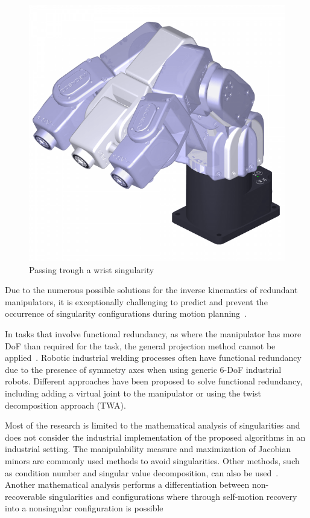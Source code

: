 \begin{figure}[H]
	\centerline{\includegraphics[scale=.25]{figures/wristsingular.png}}
	\caption{Passing trough a wrist singularity~\cite{meca}}
	\label{wristsingular}
\end{figure}
\newpage
Due to the numerous possible solutions for the inverse kinematics of redundant manipulators, it is exceptionally challenging to predict and prevent the occurrence of singularity configurations during motion planning~\cite{Shi.2021}.

In tasks that involve functional redundancy, as where the manipulator has more DoF than required for the task, the general projection method cannot be applied~\cite{Wei.2014}. Robotic industrial welding processes often have functional redundancy due to the presence of symmetry axes when using generic 6-DoF industrial robots. Different approaches have been proposed to solve functional redundancy, including adding a virtual joint to the manipulator or using the twist decomposition approach (TWA).

Most of the research is limited to the mathematical analysis of singularities and does not consider the industrial implementation of the proposed algorithms in an industrial setting. The manipulability measure and maximization of Jacobian minors are commonly used methods to avoid singularities. Other methods, such as condition number and singular value decomposition, can also be used~\cite{Stevenson.}. Another mathematical analysis performs a differentiation between non-recoverable singularities and configurations where through self-motion recovery into a nonsingular configuration is possible~\cite{Bedrossian.2002}

